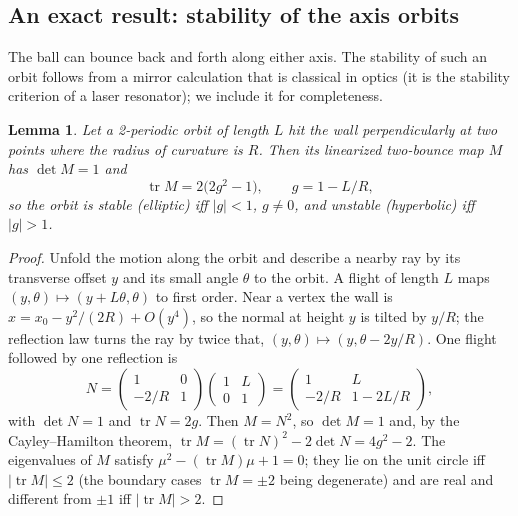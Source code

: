 \documentclass[11pt]{amsart}
\newtheorem{lemma}[theorem]{Lemma}
\theoremstyle{remark}
\begin{document}
\subsection{An exact result: stability of the axis orbits}

The ball can bounce back and forth along either axis. The stability of such
an orbit follows from a mirror calculation that is classical in optics (it is
the stability criterion of a laser resonator); we include it for completeness.

\begin{lemma}\label{lem:trace}
Let a 2-periodic orbit of length $L$ hit the wall perpendicularly at two points
where the radius of curvature is $R$. Then its linearized two-bounce map $M$
has $\det M = 1$ and
\[
  \operatorname{tr} M = 2\bigl(2g^2 - 1\bigr), \qquad g = 1 - L/R,
\]
so the orbit is stable (elliptic) iff $|g| < 1$, $g \neq 0$, and unstable
(hyperbolic) iff $|g| > 1$.
\end{lemma}

\begin{proof}
Unfold the motion along the orbit and describe a nearby ray by its transverse
offset $y$ and its small angle $\theta$ to the orbit. A flight of length $L$
maps $(y, \theta) \mapsto (y + L\theta, \theta)$ to first order. Near a vertex
the wall is $x = x_0 - y^2/(2R) + O(y^4)$, so the normal at height $y$ is
tilted by $y/R$; the reflection law turns the ray by twice that,
$(y, \theta) \mapsto (y, \theta - 2y/R)$. One flight followed by one
reflection is
\[
  N = \begin{pmatrix}1 & 0\\ -2/R & 1\end{pmatrix}
      \begin{pmatrix}1 & L\\ 0 & 1\end{pmatrix}
    = \begin{pmatrix}1 & L\\ -2/R & 1 - 2L/R\end{pmatrix},
\]
with $\det N = 1$ and $\operatorname{tr} N = 2g$. Then $M = N^2$, so
$\det M = 1$ and, by the Cayley--Hamilton theorem,
$\operatorname{tr} M = (\operatorname{tr} N)^2 - 2\det N = 4g^2 - 2$.
The eigenvalues of $M$ satisfy $\mu^2 - (\operatorname{tr} M)\mu + 1 = 0$;
they lie on the unit circle iff $|\operatorname{tr} M| \le 2$ (the boundary
cases $\operatorname{tr} M = \pm 2$ being degenerate) and are real and
different from $\pm 1$ iff $|\operatorname{tr} M| > 2$.
\end{proof}
\end{document}

